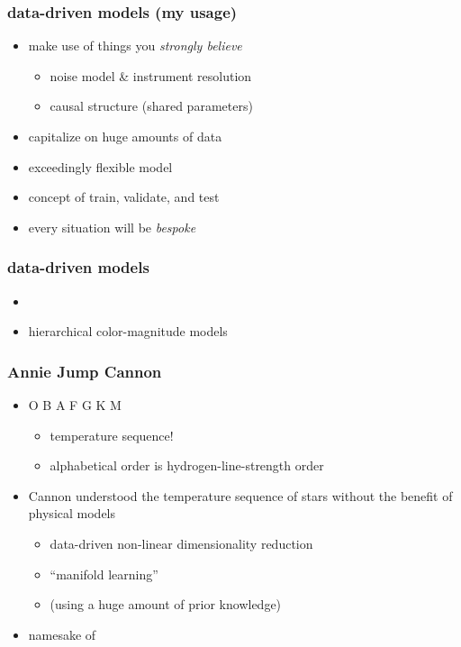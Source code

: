 \documentclass[pdftex]{beamer}
\begin{document}
\begin{frame}
  \frametitle{data-driven models (my usage)}
  \begin{itemize}
  \item make use of things you \emph{strongly believe}
    \begin{itemize}
    \item noise model \& instrument resolution
    \item causal structure (shared parameters)
    \end{itemize}
  \item capitalize on huge amounts of data
  \item exceedingly flexible model
  \item concept of train, validate, and test
  \item every situation will be \emph{bespoke}
  \end{itemize}
\end{frame}

\begin{frame}
  \frametitle{data-driven models}
  \begin{itemize}
  \item \tc
  \item hierarchical color-magnitude models
  \end{itemize}
\end{frame}

\begin{frame}
  \frametitle{Annie Jump Cannon}
  \begin{itemize}
  \item O B A F G K M
    \begin{itemize}
    \item temperature sequence!
    \item alphabetical order is hydrogen-line-strength order
    \end{itemize}
  \item Cannon understood the temperature sequence of stars without the benefit of physical models
    \begin{itemize}
    \item data-driven non-linear dimensionality reduction
    \item ``manifold learning''
    \item (using a huge amount of prior knowledge)
    \end{itemize}
  \item namesake of \tc
  \end{itemize}
\end{frame}
\end{document}
